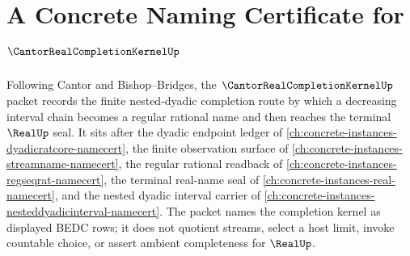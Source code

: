 \chapter{A Concrete Naming Certificate for $\CantorRealCompletionKernelUp$}
\label{ch:concrete-instances-cantor-real-completion-kernel-namecert}

Following Cantor and Bishop--Bridges, the $\CantorRealCompletionKernelUp$ packet records the finite nested-dyadic completion route by which a decreasing interval chain becomes a regular rational name and then reaches the terminal $\RealUp$ seal. It sits after the dyadic endpoint ledger of \autoref{ch:concrete-instances-dyadicratcore-namecert}, the finite observation surface of \autoref{ch:concrete-instances-streamname-namecert}, the regular rational readback of \autoref{ch:concrete-instances-regseqrat-namecert}, the terminal real-name seal of \autoref{ch:concrete-instances-real-namecert}, and the nested dyadic interval carrier of \autoref{ch:concrete-instances-nesteddyadicinterval-namecert}. The packet names the completion kernel as displayed BEDC rows; it does not quotient streams, select a host limit, invoke countable choice, or assert ambient completeness for $\RealUp$.

